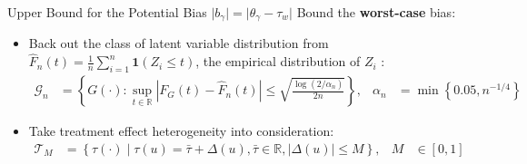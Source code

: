  \begin{frame}{Upper Bound for the Potential Bias $ \lvert b_{\gamma} \rvert = \lvert \theta_{\gamma}-\tau_{w} \rvert$}
    Bound the \textcolor{mygreen}{\textbf{worst-case}} bias:
    \begin{itemize}
        \item<2-> Back out the class of latent variable distribution from $\hat{F}_n(t)=\frac{1}{n}\sum^n_{i=1}\mathbf{1}(Z_i\leq t)$, the empirical distribution of $Z_i$ \citep{massart1990tight}:
        \begin{align*}
            \mathcal{G}_n &= \left\{ G(\cdot): \sup_{t\in\mathbb{R}}\left|F_{G}\left(t\right)-\hat{F}_{n}\left(t\right)\right|\leq\sqrt{\frac{\log\left(2/\alpha_{n}\right)}{2n}}  \right\}, & \alpha_n&=\min\left\{0.05,n^{-1/4} \right\}
        \end{align*}
        \item<3-> Take treatment effect heterogeneity into consideration: 
        \begin{align*}
            \mathcal{T}_{M} &=\left\{ \tau\left(\cdot\right)\mid\tau\left(u\right)=\bar{\tau}+\Delta\left(u\right), \bar{\tau}\in\mathbb{R},\left|\Delta\left(u\right)\right|\leq M\right\},& M&\in[0,1]
        \end{align*}
    \end{itemize}
    
 \end{frame}

